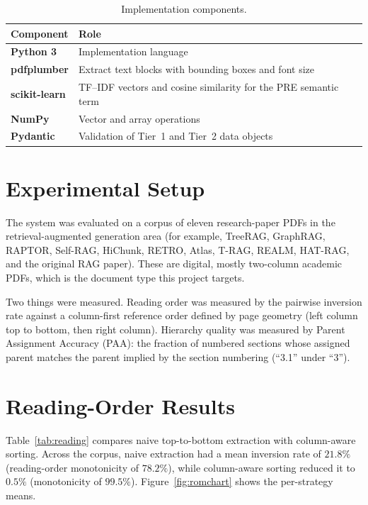 \documentclass[12pt,a4paper,twoside,openright]{report}
\begin{document}
\begin{table}[!htbp]
\centering
\caption{Implementation components.}
\label{tab:stack}
\renewcommand{\arraystretch}{1.25}
{\small
\begin{tabularx}{\textwidth}{@{} >{\bfseries}l X @{}}
\toprule
Component & Role \\ \midrule
Python 3 & Implementation language \\
pdfplumber & Extract text blocks with bounding boxes and font size \\
scikit-learn & TF--IDF vectors and cosine similarity for the PRE semantic term \\
NumPy & Vector and array operations \\
Pydantic & Validation of Tier~1 and Tier~2 data objects \\ \bottomrule
\end{tabularx}}
\end{table}

\section{Experimental Setup}
The system was evaluated on a corpus of eleven research-paper PDFs in the
retrieval-augmented generation area (for example, TreeRAG, GraphRAG, RAPTOR, Self-RAG,
HiChunk, RETRO, Atlas, T-RAG, REALM, HAT-RAG, and the original RAG paper). These are
digital, mostly two-column academic PDFs, which is the document type this project
targets.

Two things were measured. Reading order was measured by the pairwise inversion rate
against a column-first reference order defined by page geometry (left column top to
bottom, then right column). Hierarchy quality was measured by Parent Assignment
Accuracy (PAA): the fraction of numbered sections whose assigned parent matches the
parent implied by the section numbering (``3.1'' under ``3'').

\section{Reading-Order Results}
Table~\ref{tab:reading} compares naive top-to-bottom extraction with column-aware
sorting. Across the corpus, naive extraction had a mean inversion rate of $21.8\%$
(reading-order monotonicity of $78.2\%$), while column-aware sorting reduced it to
$0.5\%$ (monotonicity of $99.5\%$). Figure~\ref{fig:romchart} shows the per-strategy
means.
\end{document}
